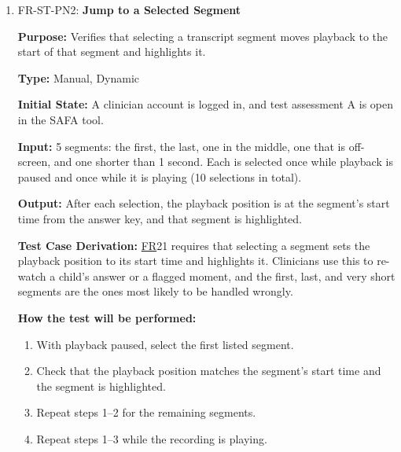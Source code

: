\documentclass[12pt, titlepage]{article}
\newcommand{\srsfr}[1]{\href{https://github.com/Nour-Fawaz/MacaBoca/blob/main/pdfs/SRS/SRS.pdf}{FR}}
\renewcommand{\_}{\oldunderscore\allowbreak}
\begin{document}
\begin{enumerate}
  \item FR-ST-PN2: \textbf{Jump to a Selected Segment\\}
  \begin{mdframed}[linewidth=0.5mm]
      \textbf{Purpose:} Verifies that selecting a transcript segment moves playback to the start of that segment and highlights it. \par
      \textbf{Type:} Manual, Dynamic \par
      \textbf{Initial State:} A clinician account is logged in, and test assessment A is open in the SAFA tool. \par
      \textbf{Input:} 5 segments: the first, the last, one in the middle, one that is off-screen, and one shorter than 1 second. Each is selected once while playback is paused and once while it is playing (10 selections in total). \par
      \textbf{Output:} After each selection, the playback position is at the segment's start time from the answer key, and that segment is highlighted. \par
      \textbf{Test Case Derivation:} \srsfr*{21} requires that selecting a segment sets the playback position to its start time and highlights it. Clinicians use this to re-watch a child's answer or a flagged moment, and the first, last, and very short segments are the ones most likely to be handled wrongly. \par
      \textbf{How the test will be performed:}
      \begin{enumerate}
        \item[1.] With playback paused, select the first listed segment.
        \item[2.] Check that the playback position matches the segment's start time and the segment is highlighted.
        \item[3.] Repeat steps 1--2 for the remaining segments.
        \item[4.] Repeat steps 1--3 while the recording is playing.
      \end{enumerate}
  \end{mdframed}


\end{enumerate}
\end{document}
